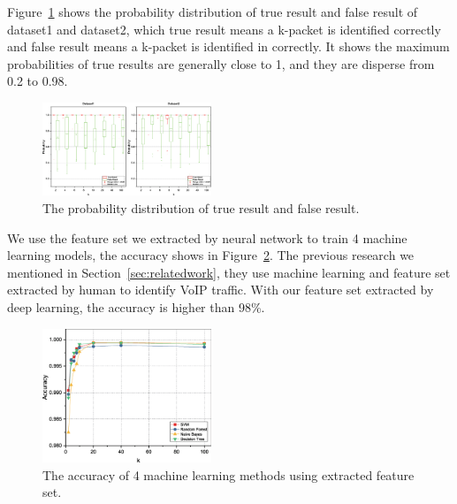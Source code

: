 \documentclass[conference]{IEEEtran}
\begin{document}
Figure~\ref{fig:tf} shows the probability distribution of true result and false result of dataset1 and dataset2, which true result means a k-packet is identified correctly and false result means a k-packet is identified in correctly. It shows the maximum probabilities of true results are generally close to 1, and they are disperse from 0.2 to 0.98.
\begin{figure}[htp]
\begin{center}
\includegraphics[width=0.45\textwidth]{tf.eps}
\caption{The probability distribution of true result and false result.}\label{fig:tf}
\end{center}
\end{figure}
We use the feature set we extracted by neural network to train 4 machine learning models, the accuracy shows in Figure~\ref{fig:ml}. The previous research we mentioned in Section~\ref{sec:relatedwork}, they use machine learning and feature set extracted by human to identify VoIP traffic. With our feature set extracted by deep learning, the accuracy is higher than 98\%.
\begin{figure}
  \centering
  \includegraphics[width=0.45\textwidth]{ml.eps}
  \caption{The accuracy of 4 machine learning methods using extracted feature set.}
  \label{fig:ml}
\end{figure}
\end{document}
